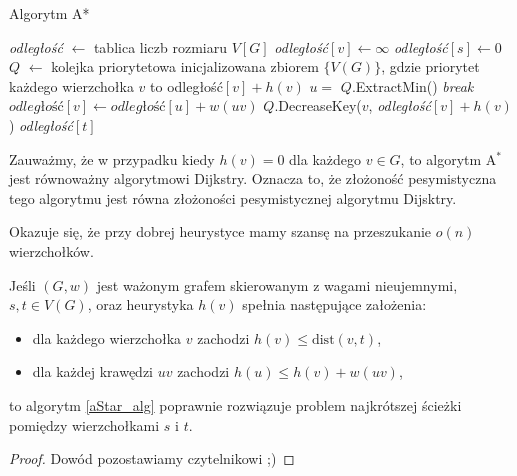\begin{algorithm}[H]
	\caption{Algorytm A*}
	\begin{algorithmic}[1]
		\State \textit{odległość} $\gets$ tablica liczb rozmiaru $V[G]$
		\State \textit{odległość}$[v]\gets\infty$
		\EndFor
		\State \textit{odległość}$[s]\gets 0$
		\State $Q$ $\gets$ kolejka priorytetowa inicjalizowana 
		zbiorem $\{V(G)\}$, gdzie priorytet każdego wierzchołka $v$
		to odległość$[v] + h(v)$
		\State $u =$ $Q$.ExtractMin()
		\State \textit{break}
		\EndIf
		\State $\textit{odległość}[v] \gets \textit{odległość}[u] + w(uv)$
		\State $Q$.DecreaseKey($v$, \textit{odległość}$[v] + h(v)$)
		\EndIf
		\EndFor
		\EndWhile
		\State \Return \textit{odległość}$[t]$
		\EndProcedure
	\end{algorithmic}
	\label{aStar_alg}
\end{algorithm}

Zauważmy, że w przypadku kiedy $h(v) = 0$ dla każdego $v \in G$, 
to algorytm A$^*$ jest równoważny algorytmowi Dijkstry. Oznacza to, że
złożoność pesymistyczna tego algorytmu jest równa złożoności
pesymistycznej algorytmu Dijsktry.

Okazuje się, że przy dobrej heurystyce mamy szansę na 
przeszukanie $o(n)$ wierzchołków. %

\begin{theorem}
	 Jeśli
	$(G, w)$ jest ważonym grafem skierowanym
	z wagami nieujemnymi,
	$s,t \in V(G)$, oraz heurystyka $h(v)$
	spełnia następujące założenia:
	\begin{itemize}
		\item dla każdego wierzchołka $v$ zachodzi $h(v) \leq \text{dist}(v, t)$,
		\item dla każdej krawędzi $uv$ zachodzi $h(u) \leq h(v) + w(uv)$,
	\end{itemize}
	to algorytm \ref{aStar_alg}
	poprawnie rozwiązuje problem najkrótszej ścieżki
	pomiędzy wierzchołkami $s$ i $t$.
	\begin{proof}
		Dowód pozostawiamy czytelnikowi ;)
	\end{proof}
	\label{aStar_proof}
\end{theorem}


